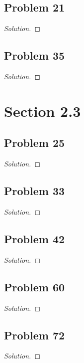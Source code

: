 \documentclass{article}
\newenvironment{solution}{\renewcommand\qedsymbol{}\begin{proof}[Solution]}{\end{proof}}
\begin{document}
\subsection*{Problem 21}
\begin{solution}
\end{solution}
\clearpage

\subsection*{Problem 35}
\begin{solution}
\end{solution}
\clearpage

\section*{Section 2.3}
\subsection*{Problem 25}
\begin{solution}
\end{solution}
\clearpage

\subsection*{Problem 33}
\begin{solution}
\end{solution}
\clearpage

\subsection*{Problem 42}
\begin{solution}
\end{solution}
\clearpage

\subsection*{Problem 60}
\begin{solution}
\end{solution}
\clearpage

\subsection*{Problem 72}
\begin{solution}
\end{solution}
\clearpage
\end{document}

